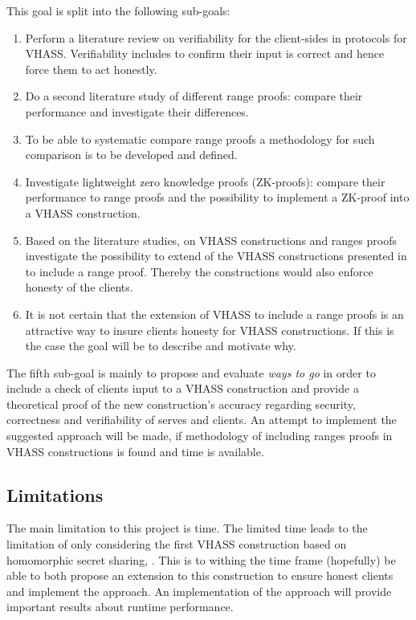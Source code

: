 \documentclass[12pt,a4paper]{article}
\begin{document}
This goal is split into the following sub-goals:
\begin{enumerate}
    \item Perform a literature review on verifiability for the client-sides in protocols for VHASS. Verifiability includes to confirm their input is correct and hence force them to act honestly.
    \item Do a second literature study of different range proofs: compare their performance and investigate their differences. 
    \item To be able to systematic compare range proofs a methodology for such comparison is to be developed and defined.
    \item Investigate lightweight zero knowledge proofs (ZK-proofs): compare their performance to range proofs and the possibility to implement a ZK-proof into a VHASS construction.
    \item Based on the literature studies, on VHASS constructions and ranges proofs investigate the possibility to extend of the VHASS constructions presented in \cite{Georgia} to include a range proof. Thereby the constructions would also enforce honesty of the clients. 
    \item It is not certain that the extension of VHASS to include a range proofs is an attractive way to insure clients honesty for VHASS constructions. If this is the case the goal will be to  describe and motivate why.
    
\end{enumerate}
The fifth sub-goal is mainly to propose and evaluate \textit{ways to go} in order to include a check of clients input to a VHASS construction and provide a theoretical proof of the new construction's  accuracy regarding security, correctness and verifiability of serves and clients. An attempt to implement the suggested approach will be made, if methodology of including ranges proofs in VHASS constructions is found and time is available.

\subsection{Limitations}
The main limitation to this project is time. The limited time leads to the limitation of only considering the first VHASS construction based on homomorphic secret sharing, \cite{Georgia}. This is to withing the time frame (hopefully) be able to both propose an extension to this construction to ensure honest clients and implement the approach. An implementation of the approach will provide important results about runtime performance. 
\end{document}
